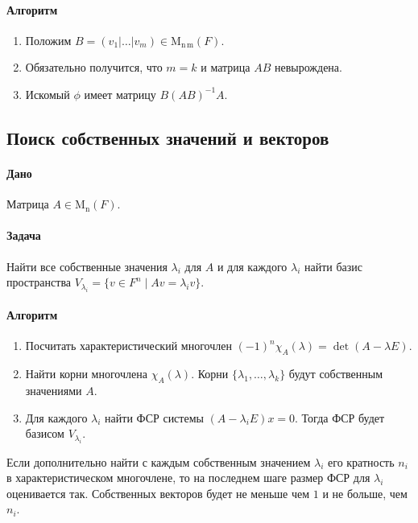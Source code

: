 \documentclass{article}
\newcommand{\MatrixDim}[3]{\operatorname{\mathrm{M}_{#2\,#3}}(#1)}
\newcommand{\Matrix}[2]{\operatorname{\mathrm{M}_{#2}}(#1)}
\begin{document}
\paragraph{Алгоритм}

\begin{enumerate}
\item Положим $B = (v_1|\ldots|v_m)\in \MatrixDim{F}{n}{m}$.

\item Обязательно получится, что $m = k$ и матрица $AB$ невырождена.

\item Искомый $\phi$ имеет матрицу $B(AB)^{-1}A$.

\end{enumerate}


\subsection{Поиск собственных значений и векторов}

\paragraph{Дано} Матрица $A\in\Matrix{F}{n}$.


\paragraph{Задача} Найти все собственные значения $\lambda_i$ для $A$ и для каждого $\lambda_i$ найти базис пространства $V_{\lambda_i} = \{v\in F^{n}\mid A v = \lambda_i v\}$.

\paragraph{Алгоритм}
\begin{enumerate}
\item Посчитать характеристический многочлен $(-1)^n\chi_A(\lambda) = \det(A-\lambda E)$.

\item Найти корни многочлена $\chi_A(\lambda)$. Корни $\{\lambda_1,\ldots,\lambda_k\}$ будут собственным значениями $A$.

\item Для каждого $\lambda_i$ найти ФСР системы $(A-\lambda_i E)x = 0$. Тогда ФСР будет базисом $V_{\lambda_i}$.
\end{enumerate}

Если дополнительно найти с каждым собственным значением $\lambda_i$ его кратность $n_i$ в характеристическом многочлене, то на последнем шаге размер ФСР для $\lambda_i$ оценивается так. Собственных векторов будет не меньше чем $1$ и не больше, чем $n_i$.
\end{document}
